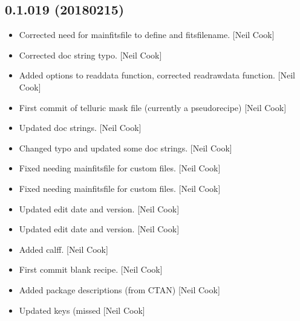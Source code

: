 \documentclass[a4paper,10pt,english]{report}
\begin{document}
\subsection{0.1.019 (2018\sphinxhyphen{}02\sphinxhyphen{}15)}
\label{\detokenize{misc/changelog:id504}}\begin{itemize}
\item {} 
Corrected need for mainfitsfile to define  and
fitsfilename. {[}Neil Cook{]}

\item {} 
Corrected doc string typo. {[}Neil Cook{]}

\item {} 
Added  options to readdata function,
corrected readrawdata function. {[}Neil Cook{]}

\item {} 
First commit of telluric mask file (currently a pseudo\sphinxhyphen{}recipe) {[}Neil
Cook{]}

\item {} 
Updated doc strings. {[}Neil Cook{]}

\item {} 
Changed typo and updated some doc strings. {[}Neil Cook{]}

\item {} 
Fixed needing mainfitsfile for custom files. {[}Neil Cook{]}

\item {} 
Fixed needing mainfitsfile for custom files. {[}Neil Cook{]}

\item {} 
Updated edit date and version. {[}Neil Cook{]}

\item {} 
Updated edit date and version. {[}Neil Cook{]}

\item {} 
Added calff. {[}Neil Cook{]}

\item {} 
First commit \sphinxhyphen{} blank  recipe. {[}Neil Cook{]}

\item {} 
Added package descriptions (from CTAN) {[}Neil Cook{]}

\item {} 
Updated keys (missed  {[}Neil Cook{]}

\end{itemize}
\end{document}
